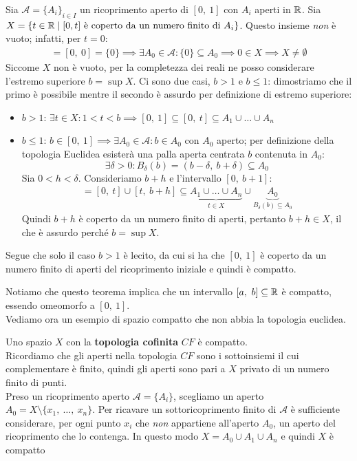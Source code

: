 \begin{demonstration}
	Sia $\mathcal{A}=\{ A_i\}_{i\in I}$ un ricoprimento aperto di $[0,\ 1]$ con $A_i$ aperti in $\mathbb{R}$.
	Sia $X=\{ t\in\mathbb{R} \mid [0,t] \text{ è coperto da un numero finito di } A_i \}$. Questo insieme \textit{non} è vuoto; infatti, per $t=0$:
		\begin{gather*}
			[0,\ t]=[0,\ 0]=\{0\}\implies\exists A_0\in\mathcal{A}\colon \{0\}\subseteq A_{0} \implies 0\in X\implies X\neq\emptyset
		\end{gather*}
	Siccome $X$ non è vuoto, per la completezza dei reali ne posso considerare l'estremo superiore $b=\sup X$. Ci sono due casi, $b>1$  e $b\leq 1$: dimostriamo che il primo è possibile mentre il secondo è assurdo per definizione di estremo superiore:
		\begin{itemize}
			\item $b>1$: $\exists t\in X \colon 1<t<b \implies [0,\ 1]\subseteq [0,\ t] \subseteq A_1\cup \ldots \cup A_n$
			\item $b\leq 1$: $b\in [0,\ 1] \implies \exists A_0\in\mathcal{A} \colon b\in A_0$ con $A_0$ aperto; per definizione della topologia Euclidea esisterà una palla aperta centrata $b$ contenuta in $A_0$:
			\begin{equation*}
				\exists \delta >0 \colon B_\delta (b)=(b-\delta, \ b+\delta )\subseteq A_0
			\end{equation*}
			Sia $0<h<\delta$. Consideriamo $b+h$ e l'intervallo $[0,\ b+1]$:
				\begin{gather*}
					[0,\ b+h]=[0,\ t]\cup [t,\ b+h]\subseteq \underbrace{A_1\cup\ldots\cup A_n}_{t\in X}\cup \underbrace{A_0}_{B_\delta (b)\subseteq A_0}
				\end{gather*}	
			Quindi $b+h$ è coperto da un numero finito di aperti, pertanto $b+h\in X$, il che è assurdo perché $b=\sup X$.
		\end{itemize}
	 Segue che solo il caso $b>1$ è lecito, da cui si ha che $[0,\ 1]$ è coperto da un numero finito di aperti del ricoprimento iniziale e quindi è compatto.
\end{demonstration}
Notiamo che questo teorema implica che un intervallo $[a,\ b]\subseteq\mathbb{R}$ è compatto, essendo omeomorfo a $[0,\ 1]$.\\
Vediamo ora un esempio di spazio compatto che non abbia la topologia euclidea.
\begin{example}
	Uno spazio $X$ con la \textbf{topologia cofinita} $CF$ è compatto.\\
	Ricordiamo che gli aperti nella topologia $CF$ sono i sottoinsiemi il cui complementare è finito, quindi gli aperti sono pari a $X$ privato di un numero finito di punti.\\
	Preso un ricoprimento aperto $\mathcal{A}=\{A_i\}$, scegliamo un aperto $A_0=X\setminus\{x_1,\ \ldots,\ x_n\}$. Per ricavare un sottoricoprimento finito di $\mathcal{A}$ è sufficiente considerare, per ogni punto $x_i$ che \textit{non} appartiene all'aperto $A_0$, un aperto del ricoprimento che lo contenga. In questo modo $X=A_0\cup A_1\cup A_n$ e quindi $X$ è compatto
\end{example}

